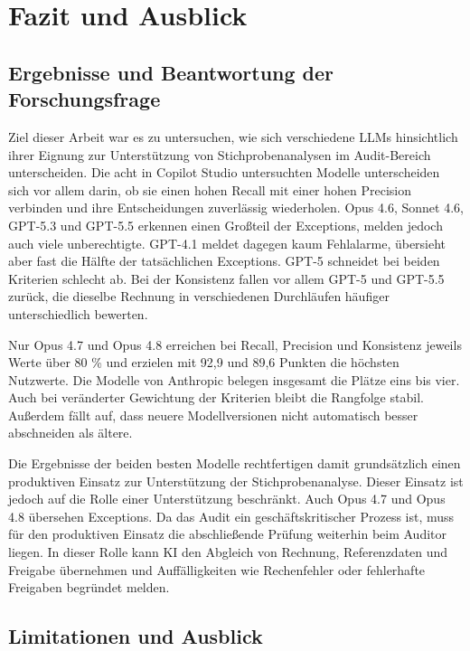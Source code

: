 \chapter{Fazit und Ausblick}
\label{chap:fazit}

\section{Ergebnisse und Beantwortung der Forschungsfrage}
\label{sec:zusammenfassung}

Ziel dieser Arbeit war es zu untersuchen, wie sich verschiedene \acp{LLM} hinsichtlich ihrer Eignung zur Unterstützung von Stichprobenanalysen im Audit-Bereich unterscheiden. Die acht in Copilot Studio untersuchten Modelle unterscheiden sich vor allem darin, ob sie einen hohen Recall mit einer hohen Precision verbinden und ihre Entscheidungen zuverlässig wiederholen. Opus 4.6, Sonnet 4.6, GPT-5.3 und GPT-5.5 erkennen einen Großteil der Exceptions, melden jedoch auch viele unberechtigte. GPT-4.1 meldet dagegen kaum Fehlalarme, übersieht aber fast die Hälfte der tatsächlichen Exceptions. GPT-5 schneidet bei beiden Kriterien schlecht ab. Bei der Konsistenz fallen vor allem GPT-5 und GPT-5.5 zurück, die dieselbe Rechnung in verschiedenen Durchläufen häufiger unterschiedlich bewerten.

Nur Opus 4.7 und Opus 4.8 erreichen bei Recall, Precision und Konsistenz jeweils Werte über 80 \% und erzielen mit 92,9 und 89,6 Punkten die höchsten Nutzwerte. Die Modelle von Anthropic belegen insgesamt die Plätze eins bis vier. Auch bei veränderter Gewichtung der Kriterien bleibt die Rangfolge stabil. Außerdem fällt auf, dass neuere Modellversionen nicht automatisch besser abschneiden als ältere.

Die Ergebnisse der beiden besten Modelle rechtfertigen damit grundsätzlich einen produktiven Einsatz zur Unterstützung der Stichprobenanalyse. Dieser Einsatz ist jedoch auf die Rolle einer Unterstützung beschränkt. Auch Opus 4.7 und Opus 4.8 übersehen Exceptions. Da das Audit ein geschäftskritischer Prozess ist, muss für den produktiven Einsatz die abschließende Prüfung weiterhin beim Auditor liegen. In dieser Rolle kann \ac{KI} den Abgleich von Rechnung, Referenzdaten und Freigabe übernehmen und Auffälligkeiten wie Rechenfehler oder fehlerhafte Freigaben begründet melden.

\section{Limitationen und Ausblick}
\label{sec:limitationen}

